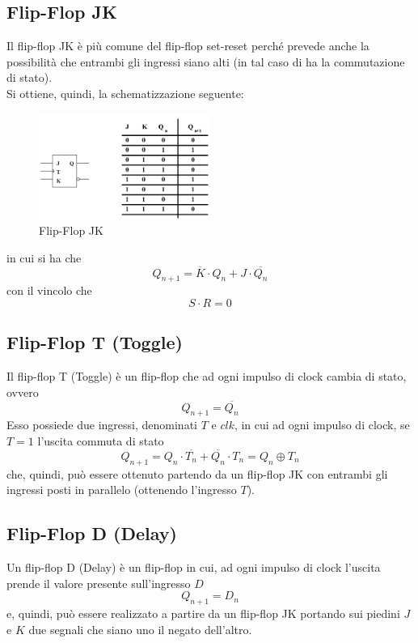 \documentclass[a4paper]{extarticle}
\begin{document}
\vspace{1em}
\subsection{Flip-Flop JK}
Il flip-flop JK è più comune del flip-flop set-reset perché prevede anche la possibilità che entrambi gli ingressi siano alti (in tal caso di ha la commutazione di stato).\\
Si ottiene, quindi, la schematizzazione seguente:

\begin{figure}[H]
    \centering
    \includegraphics[width=0.5\textwidth]{flip-flop-jk.png}
    \caption{Flip-Flop JK}
    \label{fig:flip-flop-jk}
\end{figure}

\vspace{1em}
\noindent
in cui si ha che
\[Q_{n+1} = \overline{K} \cdot Q_n + J \cdot \overline{Q_n}\]
con il vincolo che
\[S \cdot R = 0\]

\vspace{1em}
\subsection{Flip-Flop T (Toggle)}
Il flip-flop T (Toggle) è un flip-flop che ad ogni impulso di clock cambia di stato, ovvero
\[Q_{n+1} = \overline{Q_n}\]
Esso possiede due ingressi, denominati $T$ e $clk$, in cui ad ogni impulso di clock, se $T=1$ l'uscita commuta di stato
\[Q_{n+1} = Q_n \cdot \overline{T_n} + \overline{Q_n} \cdot T_n = Q_n \oplus T_n\]
che, quindi, può essere ottenuto partendo da un flip-flop JK con entrambi gli ingressi posti in parallelo (ottenendo l'ingresso $T$).

\vspace{1em}
\subsection{Flip-Flop D (Delay)}
Un flip-flop D (Delay) è un flip-flop in cui, ad ogni impulso di clock l'uscita prende il valore presente sull'ingresso $D$
\[Q_{n+1}=D_n\]
e, quindi, può essere realizzato a partire da un flip-flop JK portando sui piedini $J$ e $K$ due segnali che siano uno il negato dell'altro.
\end{document}
